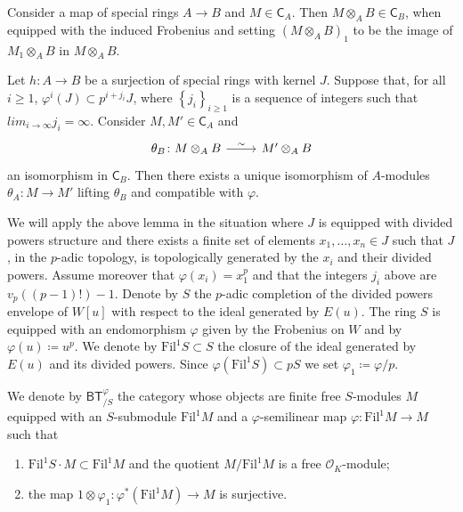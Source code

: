 \documentclass[../Main]{subfiles}
\begin{document}
\begin{defn}[]
	Consider a map of special rings $A \to B$ and $M \in \mathsf{C}_A$.
	Then $M \otimes_A B \in \mathsf{C}_B$, when equipped with
	the induced Frobenius %
	and setting
	$\left( M \otimes_A B \right)_1$ to be the image of
	$M_1 \otimes_A B$ in $M \otimes_A B$.
\end{defn}


\begin{lem}
	Let $h\colon A \to B$ be a surjection of special rings with kernel $J$.
	Suppose that, for all $i \geq 1$, $\varphi^i(J) \subset p^{i + j_i} J$,
	where $\left\{ j_i \right\}_{i \geq 1}$ is a sequence of integers
	such that $lim_{i \to \infty} j_i = \infty$.
	Consider $M, M' \in \mathsf{C}_A$ and
	\begin{equation*}
	\begin{tikzcd}[row sep = 0ex
		,/tikz/column 1/.append style={anchor=base east}
		,/tikz/column 2/.append style={anchor=base west}]
		\theta_B\colon M \otimes_A B 
		\arrow[r, "\sim", rightarrow] &
		M' \otimes_A B
	\end{tikzcd}
	\end{equation*} 
	an isomorphism in $\mathsf{C}_B$.
	Then there exists a unique isomorphism of $A$-modules
	$\theta_A\colon M \to M'$ lifting $\theta_B$ and compatible with $\varphi$.
\end{lem} 


\noindent
We will apply the above lemma in the situation where $J$ is equipped
with divided powers structure and there exists a finite set of elements $x_1, \ldots, x_n \in J$
such that $J$, in the $p$-adic topology, is topologically generated by 
the $x_i$ and their divided powers.
Assume moreover that $\varphi(x_i) = x_1^p$ and that the integers
$j_i$ above are $v_p \left( (p-1)! \right) - 1$.
Denote by $S$ the $p$-adic completion of the divided powers envelope
of $W[u]$ with respect to the ideal generated by $E(u)$.
The ring $S$ is equipped with an endomorphism $\varphi$ given by the Frobenius
on $W$ and by $\varphi(u) \coloneqq u^p$.
We denote by $\mathrm{Fil}^1 S \subset S$ the closure of the ideal
generated by $E(u)$ and its divided powers.
Since $\varphi( \mathrm{Fil}^1 S) \subset p S$ we set $\varphi_1 \coloneqq \varphi/p$.

\begin{defn}[]
	We denote by $\mathsf{BT}^{\varphi}_{/S}$ the category
	whose objects are finite free $S$-modules $M$
	equipped with an $S$-submodule $\mathrm{Fil}^1 M$
	and a $\varphi$-semilinear map $\varphi\colon  \mathrm{Fil}^1 M \to M$
	such that
\begin{enumerate}
	\item $\mathrm{Fil}^1 S \cdot M \subset \mathrm{Fil}^1 M$
		and the quotient $M/\mathrm{Fil}^1 M$ is a free $\mathcal{O}_{ K }$-module;
	\item the map $1 \otimes \varphi_1\colon 
		\varphi^* \left( \mathrm{Fil}^1 M \right) \to M$
		is surjective.
\end{enumerate}
\end{defn}
\end{document}
